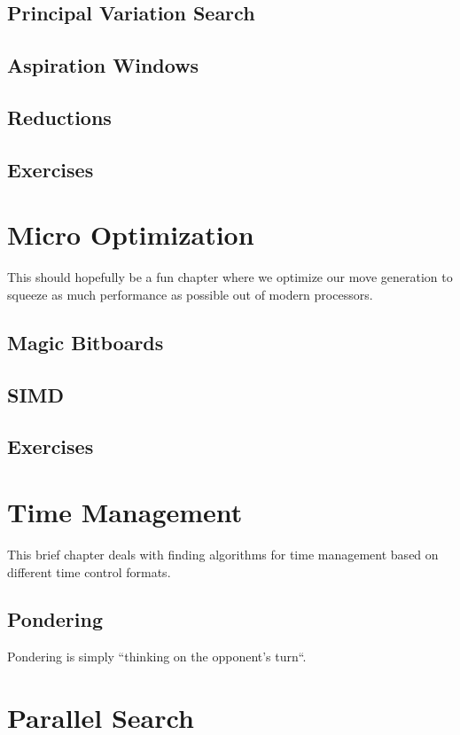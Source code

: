 \documentclass[letterpaper,11pt]{article}
\begin{document}
\subsection{Principal Variation Search}
\subsection{Aspiration Windows}
\subsection{Reductions}
\subsection{Exercises}

\section{Micro Optimization}

This should hopefully be a fun chapter where we optimize our move generation to squeeze as much performance 
as possible out of modern processors.

\subsection{Magic Bitboards}
\subsection{SIMD}
\subsection{Exercises}

\section{Time Management}

This brief chapter deals with finding algorithms for time management based on different time control formats.

\subsection{Pondering}

Pondering is simply ``thinking on the opponent's turn``.

\section{Parallel Search}
\end{document}
